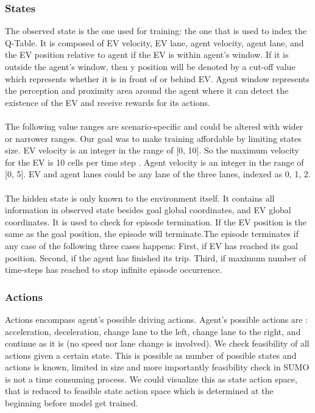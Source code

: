 \subsubsection{States}

The observed state is the one used for training: the one that is used to index the Q-Table. It is composed of EV velocity, EV lane, agent velocity, agent lane, and the EV position relative to agent if the EV is within agent’s window. If it is outside the agent's window, then y position will be denoted by a cut-off value which represents whether it is in front of or behind EV. Agent window represents the perception and proximity area around the agent where it can detect the existence of the EV and receive rewards for its actions. \\ \\
The following value ranges are scenario-specific and could be altered with wider or narrower ranges. Our goal was to make training affordable by limiting states size. EV velocity is an integer in the range of [0, 10]. So the maximum velocity for the EV is 10 cells per time step . Agent velocity is an integer in the range of [0, 5].   EV and agent lanes could be any lane of the three lanes, indexed as {0, 1, 2}. \\ \\ 
The hidden state is only known to the environment itself. It contains all information in observed state besides goal global coordinates, and EV global coordinates. It is used to check for episode termination. If the EV position is the same as the goal position, the episode will terminate.The episode terminates if any case of the following three cases happens: First, if EV has reached its goal position. Second, if the agent has finished its trip. Third, if maximum number of time-steps has reached to stop infinite episode occurrence.
\subsubsection{Actions}
Actions encompass agent’s possible driving actions.  Agent’s possible actions are : acceleration,  deceleration,  change lane to the left,  change lane to the right, and continue as it is (no speed nor lane change is involved). We  check  feasibility  of  all  actions  given  a  certain  state. This is possible as number of possible states and actions is known, limited in size and more importantly feasibility check in SUMO is not a time consuming process. We could visualize this as state action space, that is reduced to feasible state action space which is determined at the beginning before model get trained.

